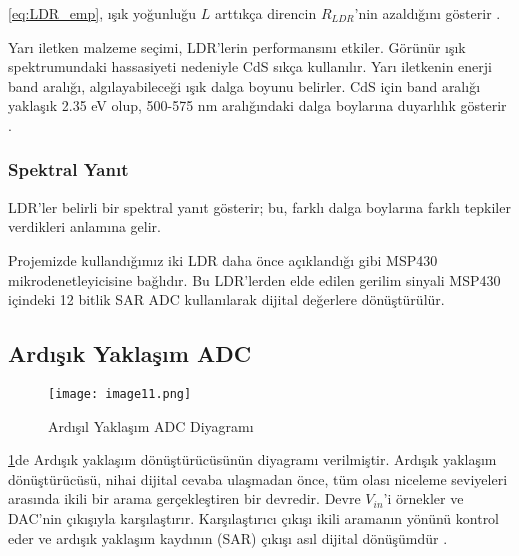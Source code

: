 \eqref{eq:LDR_emp}, ışık yoğunluğu \( L \) arttıkça direncin \( R_{LDR} \)'nin azaldığını gösterir \cite{perkinelmer2001}.


Yarı iletken malzeme seçimi, LDR'lerin performansını etkiler. Görünür ışık spektrumundaki hassasiyeti nedeniyle CdS sıkça kullanılır. Yarı iletkenin enerji band aralığı, algılayabileceği ışık dalga boyunu belirler. CdS için band aralığı yaklaşık 2.35 eV olup, 500-575 nm aralığındaki dalga boylarına duyarlılık gösterir \cite{nagesh1979photoconductivity}.

\subsubsection{Spektral Yanıt}
LDR'ler belirli bir spektral yanıt gösterir; bu, farklı dalga boylarına farklı tepkiler verdikleri anlamına gelir.

\begin{comment}
    \ref{fig:spektralyanıt}de bazı materyallerin spektral yanıtları \cite{TokenPGMPhotoresistor} makalesinden alınmıştır.

\begin{figure}[H]
    \centering
    \texttt{[image: image2]}
    \caption{CdS, CdSe ve Cd(S.Se) gibi Farklı Malzemelerin Spektral Yanıtları}
    \label{fig:spektralyanıt}
\end{figure}
\end{comment}


Projemizde kullandığımız iki LDR daha önce açıklandığı gibi MSP430 mikrodenetleyicisine bağlıdır. Bu LDR'lerden elde edilen gerilim sinyali MSP430 içindeki 12 bitlik SAR ADC kullanılarak dijital değerlere dönüştürülür.


\subsection{Ardışık Yaklaşım ADC}


\begin{figure}[H]
    \centering
    \texttt{[image: image11.png]}
    \caption{Ardışıl Yaklaşım ADC Diyagramı}
    \label{fig:sar-adc}
\end{figure}



\ref{fig:sar-adc}de Ardışık yaklaşım dönüştürücüsünün diyagramı verilmiştir. Ardışık yaklaşım dönüştürücüsü, nihai dijital cevaba ulaşmadan önce, tüm olası niceleme seviyeleri arasında ikili bir arama gerçekleştiren bir devredir. Devre $V_{in}$'i örnekler ve DAC'nin çıkışıyla karşılaştırır. Karşılaştırıcı çıkışı ikili aramanın yönünü kontrol eder ve ardışık yaklaşım kaydının (SAR) çıkışı asıl dijital dönüşümdür \cite{CMOS_SAR}. 

